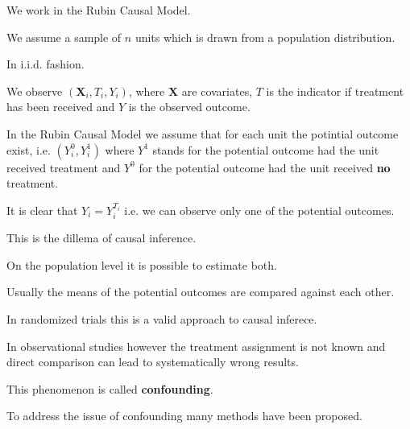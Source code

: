 We work in the Rubin Causal Model.

We assume a sample of $n$ units which is drawn from a population distribution.

In i.i.d. fashion.

We observe $ (\mathbf{X}_i, T_i, Y_i) $,
where $\mathbf{X}$ are covariates, 
$T$ is the indicator if treatment has been received
and $Y$ is the observed outcome.

In the Rubin Causal Model we assume that for each unit the potintial outcome exist, i.e. $(Y_i^0, Y_i^1)$ where $Y^1$ stands for the potential outcome had the unit received treatment and $Y^0$ for the potential outcome had the unit received \textbf{no} treatment.

It is clear that $Y_i = Y_i^{T_i}$ i.e. we can observe only one of the potential outcomes.

This is the dillema of causal inference.
 
On the population level it is possible to estimate both.

Usually the means of the potential outcomes are compared against each other.

In randomized trials this is a valid approach to causal inferece.

In observational studies however the treatment assignment is not known and direct comparison can lead to systematically wrong results.

This phenomenon is called \textbf{confounding}.
 
To address the issue of confounding many methods have been proposed.
